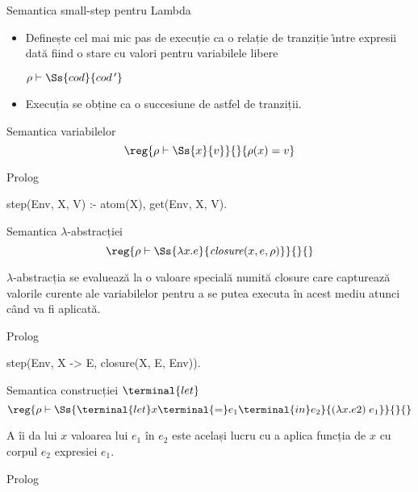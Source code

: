 \documentclass[xcolor=x11names,compress,10pt]{beamer}
\begin{document}
\begin{frame}[fragile]{Semantica small-step pentru Lambda}
\vspace*{0.5cm}
\begin{itemize}
  \item Definește cel mai mic pas de execuție ca o relație de tranziție  \^{\i}ntre expresii
    dată fiind o stare cu valori pentru variabilele libere
  \begin{center}
	$\rho \vdash \Ss{cod}{cod\,'}$ \hfill{}
  \end{center}

  \item Execuția se obține ca o succesiune de astfel de tranziții.
\end{itemize}
\end{frame}

\begin{frame}[fragile]{Semantica variabilelor}
	\[\reg{\rho \vdash \Ss{x}{v}}{}{\rho(x) = v}\]
  \begin{block}{Prolog}
    \begin{asciipl}
      step(Env, X, V) :- atom(X), get(Env, X, V).
    \end{asciipl}
  \end{block}

\end{frame}

\begin{frame}[fragile]{Semantica $\lambda$-abstracției}
	\[\reg{\rho \vdash \Ss{\lambda x. e}{{\it closure}(x, e, \rho)}}{}{}\]

  $\lambda$-abstracția se evaluează la o valoare specială numită closure
  care capturează valorile curente ale variabilelor pentru a se putea
  executa în acest mediu atunci când va fi aplicată.

  \begin{block}{Prolog}
    \begin{asciipl}
      step(Env, X -> E, closure(X, E, Env)).
    \end{asciipl}
  \end{block}

\end{frame}

\begin{frame}[fragile]{Semantica construcției $\terminal{let}$}
	\[\reg{\rho \vdash \Ss{\terminal{let} x \terminal{=} e_1 \terminal{in} e_2}{(\lambda x . e2)\; e_1}}{}{}\]

  A îi da lui $x$ valoarea lui $e_1$ în $e_2$ este același lucru cu a
  aplica funcția de $x$ cu corpul $e_2$ expresiei $e_1$.

  \begin{block}{Prolog}
  \end{block}

\end{frame}
\end{document}
